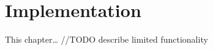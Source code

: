 
\chapter{Implementation}\label{ch:implementation}
This chapter\ldots
//TODO describe limited functionality





